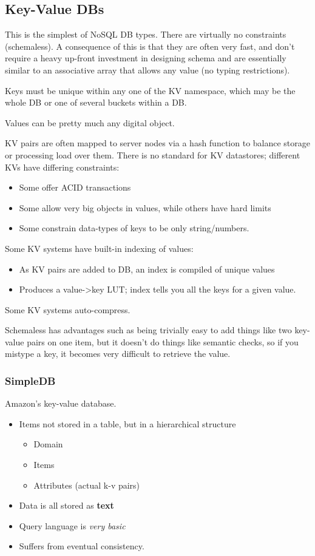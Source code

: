\documentclass[11pt,a4paper,titlepage,dvipsnames,cmyk]{scrartcl}
\begin{document}
\subsection{Key-Value DBs}
This is the simplest of NoSQL DB types. There are virtually no constraints (schemaless). A consequence of this is that they are often very fast, and don't require a heavy up-front investment in designing schema and are essentially similar to an associative array that allows any value (no typing restrictions).

Keys must be unique within any one of the KV namespace, which may be the whole DB or one of several buckets within a DB.

Values can be pretty much any digital object.

KV pairs are often mapped to server nodes via a hash function to balance storage or processing load over them. There is no standard for KV datastores; different KVs have differing constraints:
\begin{itemize}
    \item Some offer ACID transactions
    \item Some allow very big objects in values, while others have hard limits
    \item Some constrain data-types of keys to be only string/numbers.
\end{itemize}

Some KV systems have built-in indexing of values:
\begin{itemize}
    \item As KV pairs are added to DB, an index is compiled of unique values
    \item Produces a value->key LUT; index tells you all the keys for a given value.
\end{itemize}

Some KV systems auto-compress.

Schemaless has advantages such as being trivially easy to add things like two key-value pairs on one item, but it doesn't do things like semantic checks, so if you mistype a key, it becomes very difficult to retrieve the value.

\subsubsection{SimpleDB}
Amazon's key-value database.
\begin{itemize}
    \item Items not stored in a table, but in a hierarchical structure
    \begin{itemize}
        \item Domain
        \item Items
        \item Attributes (actual k-v pairs)
    \end{itemize}
    \item Data is all stored as \textbf{text}
    \item Query language is \textit{very basic}
    \item Suffers from eventual consistency.
\end{itemize}
\end{document}
